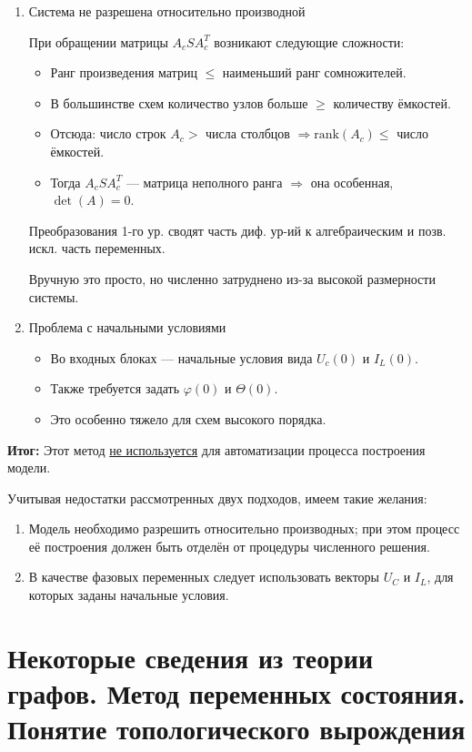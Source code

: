 	\begin{enumerate}[leftmargin=1.15em]
		\item Система не разрешена относительно производной
		\par
		При обращении матрицы $A_c S A_c^{T}$ возникают следующие сложности:
		\begin{itemize}
			\item Ранг произведения матриц $\leq$ наименьший ранг сомножителей.
			\item В большинстве схем количество узлов больше $\geq$ количеству ёмкостей.
			\item Отсюда: число строк $A_c >$ числа столбцов $\Rightarrow \text{rank}(A_c) \leq$ число ёмкостей.
			\item Тогда $A_c S A_c^{T}$ — матрица неполного ранга $\Rightarrow$ она особенная, $\det(A) = 0$.
		\end{itemize}
		Преобразования 1-го ур. сводят часть диф. ур-ий к алгебраическим и позв. искл. часть переменных.
		\par
		Вручную это просто, но численно затруднено из-за высокой размерности системы.
		\item Проблема с начальными условиями
		\begin{itemize}
			\item Во входных блоках — начальные условия вида $U_c(0)$ и $I_L(0)$.
			\item Также требуется задать $\varphi(0)$ и $\Theta(0)$.
			\item Это особенно тяжело для схем высокого порядка.
		\end{itemize}
	\end{enumerate}
	
	\textbf{Итог:} Этот метод \uline{не используется} для автоматизации процесса построения модели.
	\par
	\vspace{0.5em}
	Учитывая недостатки рассмотренных двух подходов, имеем такие желания:
	\begin{enumerate}
		\item Модель необходимо разрешить относительно производных; при этом процесс её построения должен быть отделён от процедуры численного решения.
		\item В качестве фазовых переменных следует использовать векторы \( U_C \) и \( I_L \), для которых заданы начальные условия.
	\end{enumerate}
	
	\newpage
	
	\section{Некоторые сведения из теории графов. Метод переменных состояния. Понятие топологического вырождения}
	\vspace{-1em}
